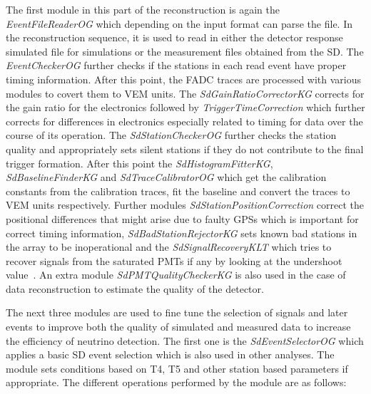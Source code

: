 The first module in this part of the reconstruction is again the \textit{EventFileReaderOG} which depending on the input format can parse the file. In the reconstruction sequence, it is used to read in either the detector response simulated file for simulations or the measurement files obtained from the SD. The \textit{EventCheckerOG} further checks if the stations in each read event have proper timing information. After this point, the FADC traces are processed with various modules to covert them to VEM units. The \textit{SdGainRatioCorrectorKG} corrects for the gain ratio for the electronics followed by \textit{TriggerTimeCorrection} which further corrects for differences in electronics especially related to timing for data over the course of its operation. The \textit{SdStationCheckerOG} further checks the station quality and appropriately sets silent stations if they do not contribute to the final trigger formation. After this point the \textit{SdHistogramFitterKG}, \textit{SdBaselineFinderKG} and \textit{SdTraceCalibratorOG} which get the calibration constants from the calibration traces, fit the baseline and convert the traces to VEM units respectively. Further modules \textit{SdStationPositionCorrection} correct the positional differences that might arise due to faulty GPSs which is important for correct timing information, \textit{SdBadStationRejectorKG} sets known bad stations in the array to be inoperational and the \textit{SdSignalRecoveryKLT} which tries to recover signals from the saturated PMTs if any by looking at the undershoot value~\cite{}. An extra module \textit{SdPMTQualityCheckerKG} is also used in the case of data reconstruction to estimate the quality of the detector.

The next three modules are used to fine tune the selection of signals and later events to improve both the quality of simulated and measured data to increase the efficiency of neutrino detection. The first one is the \textit{SdEventSelectorOG} which applies a basic SD event selection which is also used in other analyses. The module sets conditions based on T4, T5 and other station based parameters if appropriate. The different operations performed by the module are as follows:

